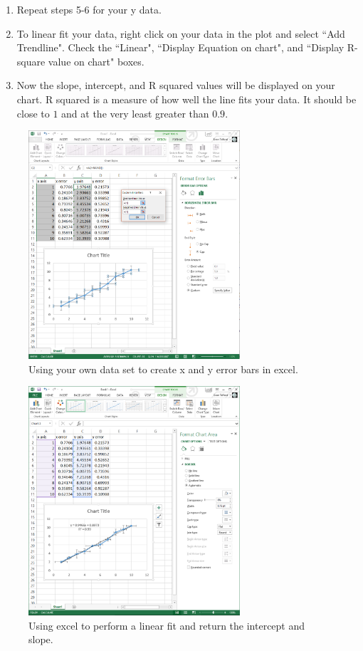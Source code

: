 \begin{enumerate}
\item Repeat steps 5-6 for your y data.
\item To linear fit your data, right click on your data in the plot and select ``Add Trendline". Check the ``Linear", ``Display Equation on chart", and ``Display R-square value on chart" boxes.
\item Now the slope, intercept, and R squared values will be displayed on your chart. R squared is a measure of how well the line fits your data. It should be close to $1$ and at the very least greater than $0.9$.
\end{enumerate}

\begin{figure}[h!]
\centering
\includegraphics[height=0.4\textheight, width=0.7\textwidth]{./Exp1-2/pic/image5.png}
\caption{Using your own data set to create x and y error bars in excel.}
\label{fig:excel2}
\end{figure}

\begin{figure}[h!]
\centering
\includegraphics[height=0.4\textheight, width = 0.7\textwidth]{./Exp1-2/pic/image6.png}
\caption{Using excel to perform a linear fit and return the intercept and slope.}
\label{fig:excel3}
\end{figure}

